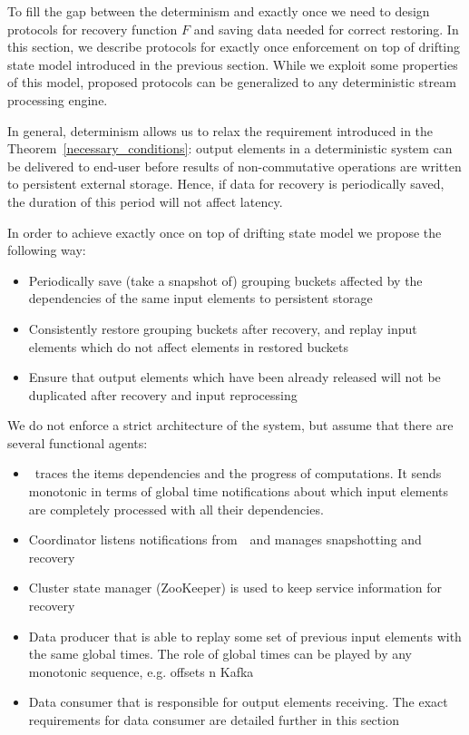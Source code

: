 
\label {fs-consistency-section}

To fill the gap between the determinism and exactly once we need to design protocols for recovery function $F$ and saving data needed for correct restoring. In this section, we describe protocols for exactly once enforcement on top of drifting state model introduced in the previous section. While we exploit some properties of this model, proposed protocols can be generalized to any deterministic stream processing engine.

In general, determinism allows us to relax the requirement introduced in the Theorem~\ref{necessary_conditions}: output elements in a deterministic system can be delivered to end-user before results of non-commutative operations are written to persistent external storage. Hence, if data for recovery is periodically saved, the duration of this period will not affect latency.

In order to achieve exactly once on top of drifting state model we propose the following way:
\begin{itemize}
    \item Periodically save (take a snapshot of) grouping buckets affected by the dependencies of the same input elements to persistent storage
    \item Consistently restore grouping buckets after recovery, and replay input elements which do not affect elements in restored buckets
    \item Ensure that output elements which have been already released will not be duplicated after recovery and input reprocessing
\end{itemize}

We do not enforce a strict architecture of the system, but assume that there are several functional agents:
\begin{itemize}
    \item \Acker\ traces the items dependencies and the progress of computations. It sends monotonic in terms of global time notifications about which input elements are completely processed with all their dependencies.
    \item Coordinator listens notifications from~\Acker\ and manages snapshotting and recovery
    \item Cluster state manager (ZooKeeper) is used to keep service information for recovery
    \item Data producer that is able to replay some set of previous input elements with the same global times. The role of global times can be played by any monotonic sequence, e.g. offsets n Kafka
    \item Data consumer that is responsible for output elements receiving. The exact requirements for data consumer are detailed further in this section
\end{itemize}

